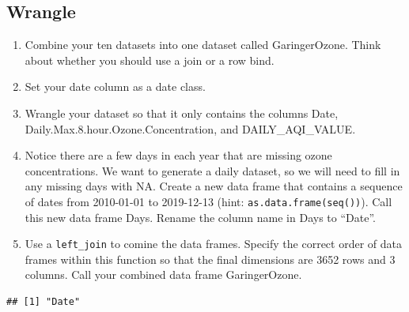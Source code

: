 \documentclass[]{article}
\newenvironment{Shaded}{\begin{snugshade}}{\end{snugshade}}
\newcommand{\CommentTok}[1]{\textcolor[rgb]{0.56,0.35,0.01}{\textit{#1}}}
\newcommand{\DataTypeTok}[1]{\textcolor[rgb]{0.13,0.29,0.53}{#1}}
\newcommand{\KeywordTok}[1]{\textcolor[rgb]{0.13,0.29,0.53}{\textbf{#1}}}
\newcommand{\NormalTok}[1]{#1}
\newcommand{\OperatorTok}[1]{\textcolor[rgb]{0.81,0.36,0.00}{\textbf{#1}}}
\newcommand{\StringTok}[1]{\textcolor[rgb]{0.31,0.60,0.02}{#1}}
\begin{document}
\hypertarget{wrangle}{%
\subsection{Wrangle}\label{wrangle}}

\begin{enumerate}
\def\labelenumi{\arabic{enumi}.}
\setcounter{enumi}{1}
\item
  Combine your ten datasets into one dataset called GaringerOzone. Think
  about whether you should use a join or a row bind.
\item
  Set your date column as a date class.
\item
  Wrangle your dataset so that it only contains the columns Date,
  Daily.Max.8.hour.Ozone.Concentration, and DAILY\_AQI\_VALUE.
\item
  Notice there are a few days in each year that are missing ozone
  concentrations. We want to generate a daily dataset, so we will need
  to fill in any missing days with NA. Create a new data frame that
  contains a sequence of dates from 2010-01-01 to 2019-12-13 (hint:
  \texttt{as.data.frame(seq())}). Call this new data frame Days. Rename
  the column name in Days to ``Date''.
\item
  Use a \texttt{left\_join} to comine the data frames. Specify the
  correct order of data frames within this function so that the final
  dimensions are 3652 rows and 3 columns. Call your combined data frame
  GaringerOzone.
\end{enumerate}

\begin{Shaded}
\end{Shaded}

\begin{verbatim}
## [1] "Date"
\end{verbatim}
\end{document}
